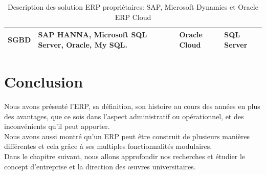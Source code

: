 \begin{table}[H]
\begin{center}
\begin{tabular}{|F{2.3cm}|R{3.5cm}|R{3.5cm}|R{3.5cm}|}
                \hline
                SGBD
                &
                SAP HANNA, Microsoft SQL Server, Oracle, My
                SQL.
                &
                Oracle Cloud
                &
                SQL Server
                \\
                
                \hline
            \end{tabular}	
            \caption{Description des solution \acs{ERP} propriétaires: SAP, Microsoft Dynamics et Oracle \acs{ERP} Cloud}
        \end{center}
    \end{table}    

\section{Conclusion}
Nous avons présenté l'\acs{ERP}, sa définition, son histoire au cours des années en plus des avantages, que ce sois dans l'aspect administratif ou opérationnel, et des inconvénients qu'il peut apporter.\\

Nous avons aussi montré qu'un \acs{ERP} peut être construit de plusieurs manières différentes et cela grâce à ses multiples fonctionnalités modulaires.\\

Dans le chapitre suivant, nous allons approfondir nos recherches et étudier le concept d'entreprise et la direction des œuvres universitaires.\\